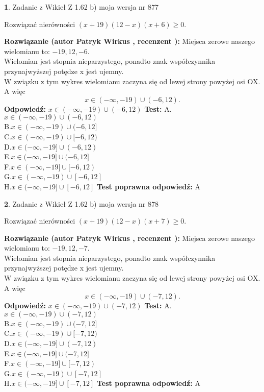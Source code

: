 \documentclass[12pt, a4paper]{article}
\theoremstyle{definition} %
\newtheorem{zad}{}
\newcommand{\zadStart}[1]{\begin{zad}#1\newline}
\newcommand{\zadStop}{\end{zad}}
\newcommand{\rozwStart}[2]{\noindent \textbf{Rozwiązanie (autor #1 , recenzent #2): }\newline}
\newcommand{\rozwStop}{\newline}
\newcommand{\odpStart}{\noindent \textbf{Odpowiedź:}\newline}
\newcommand{\odpStop}{\newline}
\newcommand{\testStart}{\noindent \textbf{Test:}\newline}
\newcommand{\testStop}{\newline}
\newcommand{\kluczStart}{\noindent \textbf{Test poprawna odpowiedź:}\newline}
\newcommand{\kluczStop}{\newline}
\begin{document}
\zadStart{Zadanie z Wikieł Z 1.62 b) moja wersja nr 877}

Rozwiązać nierówności $(x+19)(12-x)(x+6)\ge0$.
\zadStop
\rozwStart{Patryk Wirkus}{}
Miejsca zerowe naszego wielomianu to: $-19, 12, -6$.\\
Wielomian jest stopnia nieparzystego, ponadto znak współczynnika przy\linebreak najwyższej potędze x jest ujemny.\\ W związku z tym wykres wielomianu zaczyna się od lewej strony powyżej osi OX. A więc $$x \in (-\infty,-19) \cup (-6,12).$$
\rozwStop
\odpStart
$x \in (-\infty,-19) \cup (-6,12)$
\odpStop
\testStart
A.$x \in (-\infty,-19) \cup (-6,12)$\\
B.$x \in (-\infty,-19) \cup (-6,12]$\\
C.$x \in (-\infty,-19) \cup [-6,12)$\\
D.$x \in (-\infty,-19] \cup (-6,12)$\\
E.$x \in (-\infty,-19] \cup (-6,12]$\\
F.$x \in (-\infty,-19] \cup [-6,12)$\\
G.$x \in (-\infty,-19) \cup [-6,12]$\\
H.$x \in (-\infty,-19] \cup [-6,12]$
\testStop
\kluczStart
A
\kluczStop



\zadStart{Zadanie z Wikieł Z 1.62 b) moja wersja nr 878}

Rozwiązać nierówności $(x+19)(12-x)(x+7)\ge0$.
\zadStop
\rozwStart{Patryk Wirkus}{}
Miejsca zerowe naszego wielomianu to: $-19, 12, -7$.\\
Wielomian jest stopnia nieparzystego, ponadto znak współczynnika przy\linebreak najwyższej potędze x jest ujemny.\\ W związku z tym wykres wielomianu zaczyna się od lewej strony powyżej osi OX. A więc $$x \in (-\infty,-19) \cup (-7,12).$$
\rozwStop
\odpStart
$x \in (-\infty,-19) \cup (-7,12)$
\odpStop
\testStart
A.$x \in (-\infty,-19) \cup (-7,12)$\\
B.$x \in (-\infty,-19) \cup (-7,12]$\\
C.$x \in (-\infty,-19) \cup [-7,12)$\\
D.$x \in (-\infty,-19] \cup (-7,12)$\\
E.$x \in (-\infty,-19] \cup (-7,12]$\\
F.$x \in (-\infty,-19] \cup [-7,12)$\\
G.$x \in (-\infty,-19) \cup [-7,12]$\\
H.$x \in (-\infty,-19] \cup [-7,12]$
\testStop
\kluczStart
A
\kluczStop
\end{document}

